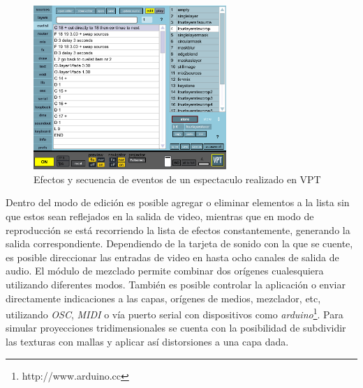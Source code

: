 \begin{figure}[H]
  \centering
    \includegraphics[width=0.65\textwidth]{./Cap3_aplicaciones/apps-vpt-cuelist.png}
  \caption{Efectos y secuencia de eventos de un espectaculo realizado en VPT}
  \label{fig:Apps-VPTCuelist}
\end{figure}

Dentro del modo de edición es posible agregar o eliminar elementos a la lista sin que estos sean reflejados en la salida de video, mientras que en modo de reproducción se está recorriendo la lista de efectos constantemente, generando la salida correspondiente.
Dependiendo de la tarjeta de sonido con la que se cuente, es posible direccionar las entradas de video en hasta ocho canales de salida de audio. El módulo de mezclado permite combinar dos orígenes cualesquiera utilizando diferentes modos. También es posible controlar la aplicación o enviar directamente indicaciones a las capas, orígenes de medios, mezclador, etc, utilizando \emph{OSC}, \emph{MIDI} o vía puerto serial con dispositivos como \emph{arduino}\footnote{http://www.arduino.cc}.
Para simular proyecciones tridimensionales se cuenta con la posibilidad de subdividir las texturas con mallas y aplicar así distorsiones a una capa dada.
